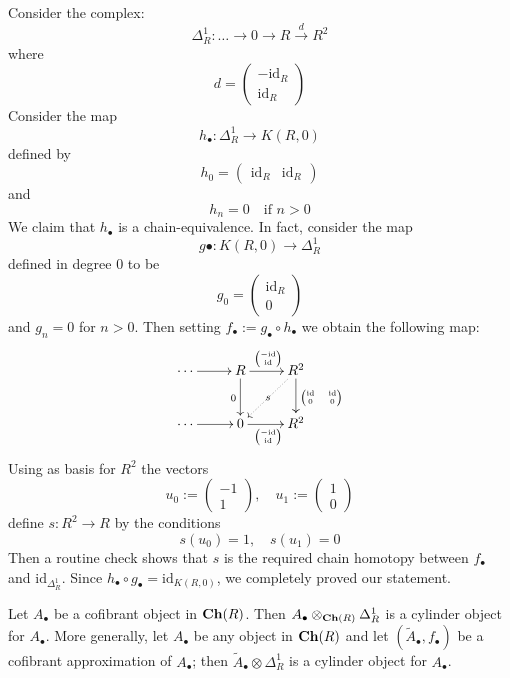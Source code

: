 \begin{eg} \label{eg delta^1 for chain complexes}
Consider the complex:
\[
\Delta^1_R \colon \ldots \to 0 \to R \xrightarrow{d} R^2
\]
where
\[
d = \begin{pmatrix} - \mathrm{id}_R \\ \mathrm{id}_R \end{pmatrix}
\]
Consider the map
\[
h_\bullet \colon \Delta^1_R \to K(R,0)
\]
defined by
\[
h_0 = \begin{pmatrix} \mathrm{id}_R & \mathrm{id}_R \end{pmatrix}
\]
and
\[
h_n = 0 \quad \text{if } n > 0
\]
We claim that $h_\bullet$ is a chain-equivalence. In fact, consider the map
\[
g \bullet \colon K(R,0) \to \Delta^1_R
\]
defined in degree $0$ to be
\[
g_0 = \begin{pmatrix} \mathrm{id}_R \\ 0 \end{pmatrix}
\]
and $g_n = 0$ for $n > 0$. Then setting $f_\bullet := g_\bullet \circ h_\bullet$ we obtain the following map:
\[
\xymatrix{
\cdots \ar[r] & R \ar[d]_0 \ar[r]^{\tiny \begin{pmatrix} - \mathrm{id} \\ \mathrm{id} \end{pmatrix}} & R^2 \ar[d]^{\tiny \begin{pmatrix} \mathrm{id} & \mathrm{id} \\ 0 & 0 \end{pmatrix}} \ar@{.>}[dl]|-s \\ \cdots \ar[r] & 0 \ar[r]_{\tiny \begin{pmatrix} - \mathrm{id} \\ \mathrm{id} \end{pmatrix}} & R^2
}
\]
Using as basis for $R^2$ the vectors
\[
u_0 := \begin{pmatrix}
-1 \\ 1
\end{pmatrix}, \quad u_1 := \begin{pmatrix} 1 \\ 0 \end{pmatrix}
\]
define $s \colon R^2 \to R$ by the conditions
\[
s(u_0) = 1, \quad s(u_1) = 0
\]
Then a routine check shows that $s$ is the required chain homotopy between $f_\bullet$ and $\mathrm{id}_{\Delta^1_R}$. Since $h_\bullet \circ g_\bullet = \mathrm{id}_{K(R,0)}$, we completely proved our statement.
\end{eg}


\begin{lemma}
Let $A_\bullet$ be a cofibrant object in $\mathbf{Ch}(R)$. Then $A_\bullet \otimes_{\mathbf{Ch}(R)} \Delta^1_R$ is a cylinder object for $A_\bullet$. More generally, let $A_\bullet$ be any object in $\mathbf{Ch}(R)$ and let $(\widetilde{A}_\bullet,f_\bullet)$ be a cofibrant approximation of $A_\bullet$; then $\widetilde{A}_\bullet \otimes \Delta^1_R$ is a cylinder object for $A_\bullet$.
\end{lemma}

